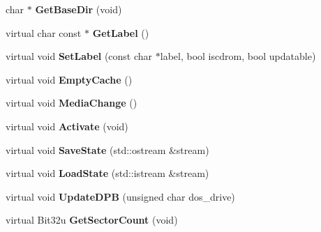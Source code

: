 \begin{DoxyCompactItemize}
\item 
\hypertarget{classDOS__Drive_abbaeec032c93d0f14760b12f39386eec}{char $\ast$ {\bfseries Get\-Base\-Dir} (void)}\label{classDOS__Drive_abbaeec032c93d0f14760b12f39386eec}

\item 
\hypertarget{classDOS__Drive_a8e239d9aa134597f38505b39b8ca8016}{virtual char const $\ast$ {\bfseries Get\-Label} ()}\label{classDOS__Drive_a8e239d9aa134597f38505b39b8ca8016}

\item 
\hypertarget{classDOS__Drive_a20d9aa48e274a59070f10d949802a4b2}{virtual void {\bfseries Set\-Label} (const char $\ast$label, bool iscdrom, bool updatable)}\label{classDOS__Drive_a20d9aa48e274a59070f10d949802a4b2}

\item 
\hypertarget{classDOS__Drive_a2ec8efe8d1b50b3c8a7b3bde52000e0e}{virtual void {\bfseries Empty\-Cache} ()}\label{classDOS__Drive_a2ec8efe8d1b50b3c8a7b3bde52000e0e}

\item 
\hypertarget{classDOS__Drive_aceabb46a487741d6c63241539811e80d}{virtual void {\bfseries Media\-Change} ()}\label{classDOS__Drive_aceabb46a487741d6c63241539811e80d}

\item 
\hypertarget{classDOS__Drive_a1007125b58463bbffb07d890fd6f1c61}{virtual void {\bfseries Activate} (void)}\label{classDOS__Drive_a1007125b58463bbffb07d890fd6f1c61}

\item 
\hypertarget{classDOS__Drive_a6efcbd5da595c208c9b3e803bb3377a8}{virtual void {\bfseries Save\-State} (std\-::ostream \&stream)}\label{classDOS__Drive_a6efcbd5da595c208c9b3e803bb3377a8}

\item 
\hypertarget{classDOS__Drive_ad78feb414f10958faefe4e7cfb489012}{virtual void {\bfseries Load\-State} (std\-::istream \&stream)}\label{classDOS__Drive_ad78feb414f10958faefe4e7cfb489012}

\item 
\hypertarget{classDOS__Drive_a706c444bff1a6155b5bdc15e8635ce73}{virtual void {\bfseries Update\-D\-P\-B} (unsigned char dos\-\_\-drive)}\label{classDOS__Drive_a706c444bff1a6155b5bdc15e8635ce73}

\item 
\hypertarget{classDOS__Drive_a6fd59860f0716da5035068104a68a2cf}{virtual Bit32u {\bfseries Get\-Sector\-Count} (void)}\label{classDOS__Drive_a6fd59860f0716da5035068104a68a2cf}


\end{DoxyCompactItemize}
